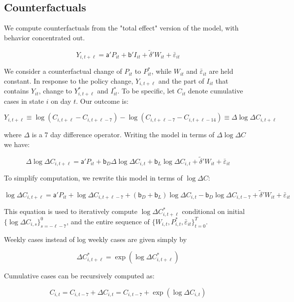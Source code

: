 \documentclass[11pt,reqno,letter]{amsart}
\theoremstyle{definition}
\begin{document}
\subsection{Counterfactuals \label{app:counterfactuals}}

We compute counterfactuals from the "total effect" version of the
model, with behavior concentrated out.

$$
Y_{i,t+\ell}
= \mathsf{a}'
P_{it} + \mathsf{b}' I_{it} +  {\tilde {\delta}}' W_{it}   + {\bar \varepsilon}_{it}
$$

We consider a counterfactual change of $P_{it}$ to $P_{it}^*$, while
$W_{it}$ and $\bar \varepsilon_{it}$ are held constant. In response to
the policy change, $Y_{i,t+\ell}$ and the part of $I_{it}$ that
contains $Y_{it}$, change to $Y_{i,t+\ell}^*$ and $I_{it}^*$. To be
specific, let $C_{it}$ denote cumulative cases in state $i$ on day
$t$. Our outcome is:

$$
Y_{i,t+\ell} \equiv \log
\left(C_{i, t+\ell} - C_{i, t + \ell - 7} \right) - \log
\left(C_{i, t+\ell-7} - C_{i, t + \ell - 14} \right) \equiv \Delta
\log \Delta C_{i,t+\ell}
$$

where $\Delta$ is a 7 day difference operator. Writing the model in
terms of $\Delta \log \Delta C$ we have:

$$
\Delta \log \Delta C_{i,t+\ell} = \mathsf{a}' P_{it} + \mathsf{b}_D
\Delta \log \Delta C_{i,t} + \mathsf{b}_L \log \Delta C_{i,t} +
{\tilde {\delta}}' W_{it}   + {\bar \varepsilon}_{it}
$$

To simplify computation, we rewrite this model in terms of $\log
\Delta C$:

$$
\log \Delta C_{i,t+\ell} = \mathsf{a}' P_{it} + \log \Delta
C_{i,t+\ell-7} + (\mathsf{b}_D + \mathsf{b}_L) \log \Delta C_{i,t} -
\mathsf{b}_D \log \Delta C_{i,t-7} + {\tilde {\delta}}' W_{it}   + {\bar \varepsilon}_{it}
$$

This equation is used to iteratively compute
$\log \Delta C_{i,t+\ell}^*$
conditional on initial $\{\log \Delta C_{i,s}\}_{s=-\ell-7}^{0}$,
and the entire sequence of $\{W_{i,t}, P_{i,t}^*, \bar \varepsilon_{it} \}_{t=0}^T$.


Weekly cases instead of log weekly cases are given simply by

$$ \Delta C_{i,t+\ell}^* = \exp(\log \Delta C_{i,t+\ell}^*)$$

Cumulative cases can be recursively computed as:

$$
  C_{i,t} = C_{i,t-7} + \Delta C_{i,t} = C_{i,t-7} + \exp(\log \Delta C_{i,t})
$$
\end{document}

